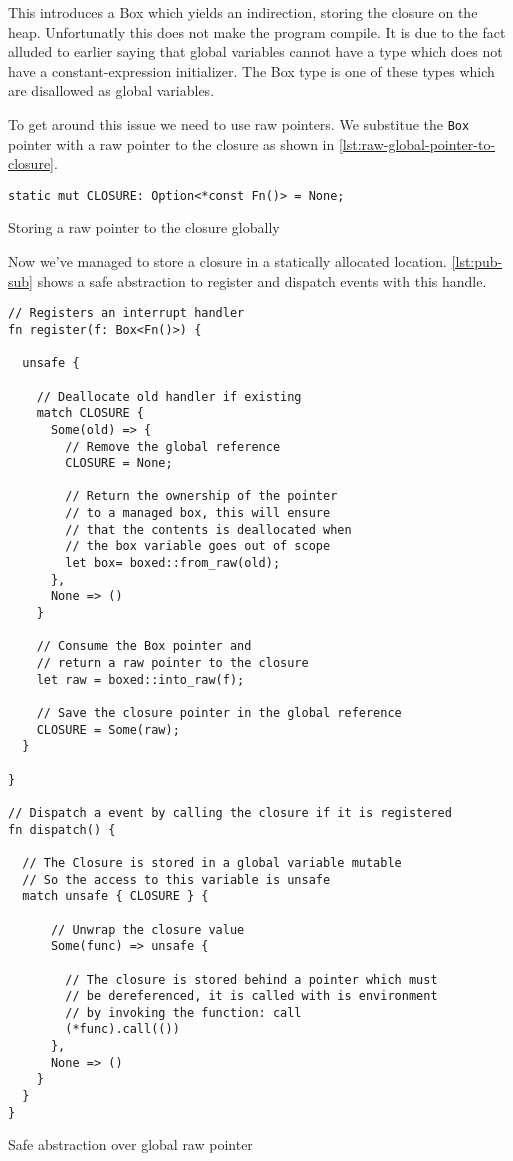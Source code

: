 This introduces a Box which yields an indirection, storing the closure on the heap.
Unfortunatly this does not make the program compile.
It is due to the fact alluded to earlier saying that global variables cannot have a type which does not have a constant-expression initializer.
The Box type is one of these types which are disallowed as global variables.

To get around this issue we need to use raw pointers.
We substitue the \texttt{Box} pointer with a raw pointer to the closure as shown in \autoref{lst:raw-global-pointer-to-closure}.

\begin{listing}[H]
  \begin{verbatim}
static mut CLOSURE: Option<*const Fn()> = None;
  \end{verbatim}
  \caption{Storing a raw pointer to the closure globally}
  \label{lst:raw-global-pointer-to-closure}
\end{listing}

Now we've managed to store a closure in a statically allocated location.
\autoref{lst:pub-sub} shows a safe abstraction to register and dispatch events with this handle.

\begin{listing}[H]
  \begin{verbatim}
// Registers an interrupt handler
fn register(f: Box<Fn()>) {

  unsafe {

    // Deallocate old handler if existing
    match CLOSURE {
      Some(old) => {
        // Remove the global reference
        CLOSURE = None;

        // Return the ownership of the pointer
        // to a managed box, this will ensure
        // that the contents is deallocated when
        // the box variable goes out of scope
        let box= boxed::from_raw(old);
      },
      None => ()
    }

    // Consume the Box pointer and
    // return a raw pointer to the closure
    let raw = boxed::into_raw(f);

    // Save the closure pointer in the global reference
    CLOSURE = Some(raw);
  }

}

// Dispatch a event by calling the closure if it is registered
fn dispatch() {

  // The Closure is stored in a global variable mutable
  // So the access to this variable is unsafe
  match unsafe { CLOSURE } {

      // Unwrap the closure value
      Some(func) => unsafe {

        // The closure is stored behind a pointer which must
        // be dereferenced, it is called with is environment
        // by invoking the function: call
        (*func).call(())
      },
      None => ()
    }
  }
}
  \end{verbatim}
  \caption{Safe abstraction over global raw pointer}
  \label{lst:reg-disp}
\end{listing}

